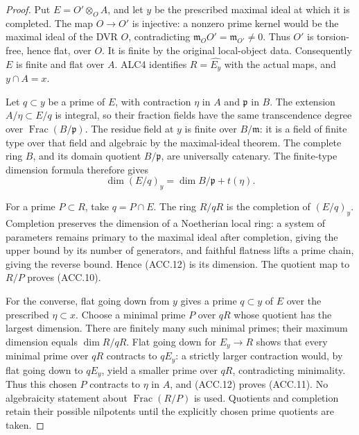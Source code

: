 \begin{proof}
Put \(E=O'\otimes_O A\), and let \(y\) be the prescribed
maximal ideal at which it is completed.  The map \(O\to O'\)
is injective: a nonzero prime kernel would be the maximal ideal of
the DVR \(O\), contradicting
\(\mathfrak m_O O'=\mathfrak m_{O'}\ne0\).  Thus \(O'\) is
torsion-free, hence flat, over \(O\).  It is finite by the original
local-object data.  Consequently \(E\) is finite and flat over
\(A\).  ALC4 identifies \(R=\widehat{E_y}\) with the actual
maps, and \(y\cap A=x\).

Let \(q\subset y\) be a prime of \(E\), with contraction
\(\eta\) in \(A\) and \(\mathfrak p\) in \(B\).
The extension \(A/\eta\subset E/q\) is integral, so their
fraction fields have the same transcendence degree over
\(\operatorname{Frac}(B/\mathfrak p)\).  The residue field at
\(y\) is finite over \(B/\mathfrak m\): it is a field of
finite type over that field and algebraic by the maximal-ideal
theorem.  The complete ring \(B\), and its domain quotient
\(B/\mathfrak p\), are universally catenary.  The finite-type
dimension formula therefore gives
\[
               \dim (E/q)_y=\dim B/\mathfrak p+t(\eta).
                                                               \tag{ACC.12}
\]

For a prime \(P\subset R\), take \(q=P\cap E\).
The ring \(R/qR\) is the completion of \((E/q)_y\).
Completion preserves the dimension of a Noetherian local ring:
a system of parameters remains primary to the maximal ideal after
completion, giving the upper bound by its number of generators,
and faithful flatness lifts a prime chain, giving the reverse bound.
Hence (ACC.12) is its dimension.  The quotient map to
\(R/P\) proves (ACC.10).

For the converse, flat going down from \(y\) gives a prime
\(q\subset y\) of \(E\) over the prescribed \(\eta\subset x\).
Choose a minimal prime \(P\) over \(qR\) whose quotient has the
largest dimension.  There are finitely many such minimal primes;
their maximum dimension equals \(\dim R/qR\).  Flat going down
for \(E_y\to R\) shows that every minimal prime over \(qR\)
contracts to \(qE_y\): a strictly larger contraction would, by
flat going down to \(qE_y\), yield a smaller prime over \(qR\),
contradicting minimality.  Thus this chosen \(P\)
contracts to \(\eta\) in \(A\), and (ACC.12) proves (ACC.11).
No algebraicity statement about \(\operatorname{Frac}(R/P)\) is
used.  Quotients and completion retain their possible nilpotents
until the explicitly chosen prime quotients are taken.
\end{proof}

